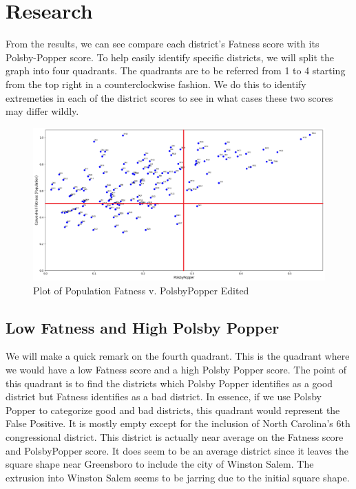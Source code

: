 \documentclass[letterpaper]{article}
\begin{document}
\section{Research}
From the results, we can see compare each district's Fatness score with its Polsby-Popper score. To help easily identify specific districts, we will split the graph into four quadrants. The quadrants are to be referred from 1 to 4 starting from the top right in a counterclockwise fashion. We do this to identify extremeties in each of the district scores to see in what cases these two scores may differ wildly.

\begin{figure}[H]
	\includegraphics[width=\linewidth]{./figures/convexHullPopulationFatnessVPPQuadrants.png}
	\caption{Plot of Population Fatness v. PolsbyPopper Edited}
	\label{fig:datapointsEdited}
\end{figure}

\subsection{Low Fatness and High Polsby Popper}
We will make a quick remark on the fourth quadrant. This is the quadrant where we would have a low Fatness score and a high Polsby Popper score. The point of this quadrant is to find the districts which Polsby Popper identifies as a good district but Fatness identifies as a bad district. In essence, if we use Polsby Popper to categorize good and bad districts, this quadrant would represent the False Positive. It is mostly empty except for the inclusion of North Carolina's 6th congressional district.
This district is actually near average on the Fatness score and PolsbyPopper score. It does seem to be an average district since it leaves the square shape near Greensboro to include the city of Winston Salem. The extrusion into Winston Salem seems to be jarring due to the initial square shape.
\end{document}
